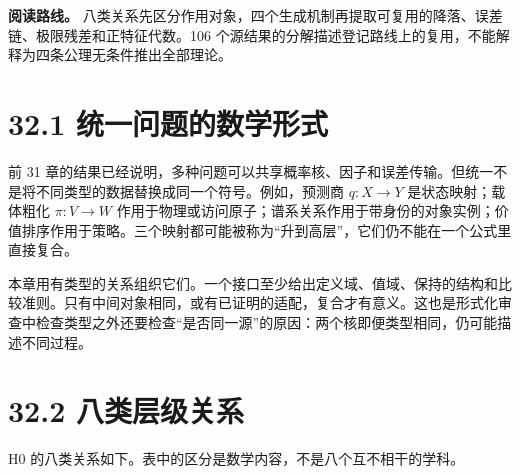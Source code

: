 \documentclass[
  11pt,
  oneside]{book}
\begin{document}
\textbf{阅读路线。} 八类关系先区分作用对象，四个生成机制再提取可复用的降落、误差链、极限残差和正特征代数。106 个源结果的分解描述登记路线上的复用，不能解释为四条公理无条件推出全部理论。

\section{32.1 统一问题的数学形式}\label{ux7edfux4e00ux95eeux9898ux7684ux6570ux5b66ux5f62ux5f0f}

前 31 章的结果已经说明，多种问题可以共享概率核、因子和误差传输。但统一不是将不同类型的数据替换成同一个符号。例如，预测商 \(q:X\to Y\) 是状态映射；载体粗化 \(\pi:V\to W\) 作用于物理或访问原子；谱系关系作用于带身份的对象实例；价值排序作用于策略。三个映射都可能被称为``升到高层''，它们仍不能在一个公式里直接复合。

本章用有类型的关系组织它们。一个接口至少给出定义域、值域、保持的结构和比较准则。只有中间对象相同，或有已证明的适配，复合才有意义。这也是形式化审查中检查类型之外还要检查``是否同一源''的原因：两个核即便类型相同，仍可能描述不同过程。

\section{32.2 八类层级关系}\label{ux516bux7c7bux5c42ux7ea7ux5173ux7cfb}

H0 的八类关系如下。表中的区分是数学内容，不是八个互不相干的学科。
\end{document}
